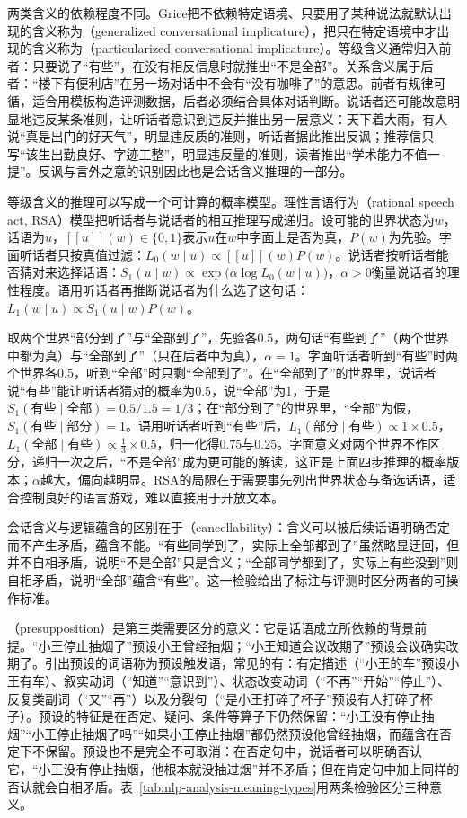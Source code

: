 两类含义的依赖程度不同。Grice把不依赖特定语境、只要用了某种说法就默认出现的含义称为（generalized conversational implicature），把只在特定语境中才出现的含义称为（particularized conversational implicature）。等级含义通常归入前者：只要说了“有些”，在没有相反信息时就推出“不是全部”。关系含义属于后者：“楼下有便利店”在另一场对话中不会有“没有咖啡了”的意思。前者有规律可循，适合用模板构造评测数据，后者必须结合具体对话判断。说话者还可能故意明显地违反某条准则，让听话者意识到违反并推出另一层意义：天下着大雨，有人说“真是出门的好天气”，明显违反质的准则，听话者据此推出反讽；推荐信只写“该生出勤良好、字迹工整”，明显违反量的准则，读者推出“学术能力不值一提”。反讽与言外之意的识别因此也是会话含义推理的一部分。

等级含义的推理可以写成一个可计算的概率模型。理性言语行为（rational speech act, RSA）模型把听话者与说话者的相互推理写成递归。设可能的世界状态为$w$，话语为$u$，$[\![u]\!](w)\in\{0,1\}$表示$u$在$w$中字面上是否为真，$P(w)$为先验。字面听话者只按真值过滤：$L_0(w\mid u)\propto[\![u]\!](w)P(w)$。说话者按听话者能否猜对来选择话语：$S_1(u\mid w)\propto\exp\bigl(\alpha\log L_0(w\mid u)\bigr)$，$\alpha>0$衡量说话者的理性程度。语用听话者再推断说话者为什么选了这句话：$L_1(w\mid u)\propto S_1(u\mid w)P(w)$。

取两个世界“部分到了”与“全部到了”，先验各$0.5$，两句话“有些到了”（两个世界中都为真）与“全部到了”（只在后者中为真），$\alpha=1$。字面听话者听到“有些”时两个世界各$0.5$，听到“全部”时只剩“全部到了”。在“全部到了”的世界里，说话者说“有些”能让听话者猜对的概率为$0.5$，说“全部”为1，于是$S_1(\text{有些}\mid\text{全部})=0.5/1.5=1/3$；在“部分到了”的世界里，“全部”为假，$S_1(\text{有些}\mid\text{部分})=1$。语用听话者听到“有些”后，$L_1(\text{部分}\mid\text{有些})\propto1\times0.5$，$L_1(\text{全部}\mid\text{有些})\propto\frac13\times0.5$，归一化得$0.75$与$0.25$。字面意义对两个世界不作区分，递归一次之后，“不是全部”成为更可能的解读，这正是上面四步推理的概率版本；$\alpha$越大，偏向越明显。RSA的局限在于需要事先列出世界状态与备选话语，适合控制良好的语言游戏，难以直接用于开放文本。

会话含义与逻辑蕴含的区别在于（cancellability）：含义可以被后续话语明确否定而不产生矛盾，蕴含不能。“有些同学到了，实际上全部都到了”虽然略显迂回，但并不自相矛盾，说明“不是全部”只是含义；“全部同学都到了，实际上有些没到”则自相矛盾，说明“全部”蕴含“有些”。这一检验给出了标注与评测时区分两者的可操作标准。

（presupposition）是第三类需要区分的意义：它是话语成立所依赖的背景前提。“小王停止抽烟了”预设小王曾经抽烟；“小王知道会议改期了”预设会议确实改期了。引出预设的词语称为预设触发语，常见的有：有定描述（“小王的车”预设小王有车）、叙实动词（“知道”“意识到”）、状态改变动词（“不再”“开始”“停止”）、反复类副词（“又”“再”）以及分裂句（“是小王打碎了杯子”预设有人打碎了杯子）。预设的特征是在否定、疑问、条件等算子下仍然保留：“小王没有停止抽烟”“小王停止抽烟了吗”“如果小王停止抽烟”都仍然预设他曾经抽烟，而蕴含在否定下不保留。预设也不是完全不可取消：在否定句中，说话者可以明确否认它，“小王没有停止抽烟，他根本就没抽过烟”并不矛盾；但在肯定句中加上同样的否认就会自相矛盾。表~\ref{tab:nlp-analysis-meaning-types}用两条检验区分三种意义。

